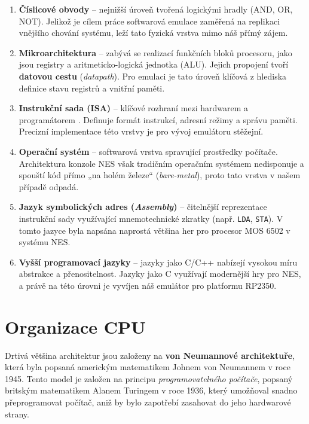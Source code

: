 \begin{enumerate}
    \item \textbf{Číslicové obvody} -- nejnižší úroveň tvořená logickými hradly (AND, OR, NOT).
        Jelikož je cílem práce softwarová emulace zaměřená na replikaci vnějšího chování systému,
        leží tato fyzická vrstva mimo náš přímý zájem.
    \item \textbf{Mikroarchitektura} -- zabývá se realizací funkčních bloků procesoru, jako jsou
        registry a aritmeticko-logická jednotka (ALU). Jejich propojení tvoří \textbf{datovou cestu}
        (\textit{datapath}). Pro emulaci je tato úroveň klíčová z hlediska definice stavu registrů a
        vnitřní paměti.
    \item \textbf{Instrukční sada (ISA)} -- klíčové rozhraní mezi hardwarem a programátorem
        \cite{arm-glossary-isa}. Definuje formát instrukcí, adresní režimy a správu paměti. Precizní
        implementace této vrstvy je pro vývoj emulátoru stěžejní.
    \item \textbf{Operační systém} -- softwarová vrstva spravující prostředky počítače. Architektura
        konzole NES však tradičním operačním systémem nedisponuje a spouští kód přímo „na holém
        železe“ (\textit{bare-metal}), proto tato vrstva v našem případě odpadá.
    \item \textbf{Jazyk symbolických adres (\textit{Assembly})} -- čitelnější reprezentace
        instrukční sady využívající mnemotechnické zkratky (např. \texttt{LDA}, \texttt{STA}). V
        tomto jazyce byla napsána naprostá většina her pro procesor MOS 6502 v systému NES.
    \item \textbf{Vyšší programovací jazyky} -- jazyky jako C/C++ nabízejí vysokou míru abstrakce a
        přenositelnost. Jazyky jako C využívají modernější hry pro NES, a právě na této úrovni je
        vyvíjen náš emulátor pro platformu RP2350.
\end{enumerate}

\section{Organizace CPU}

Drtivá většina architektur jsou založeny na \textbf{von Neumannové architektuře}, která byla popsaná
americkým matematikem Johnem von Neumannem v roce 1945. Tento model je založen na principu
\emph{programovatelného počítače}, popsaný britským matematikem Alanem Turingem v roce 1936, který
umožňoval snadno přeprogramovat počítač, aniž by bylo zapotřebí zasahovat do jeho hardwarové strany.


